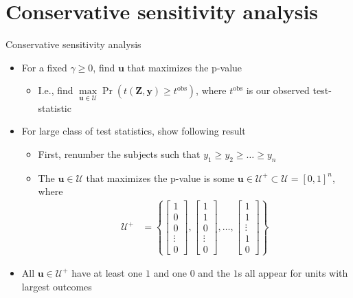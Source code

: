 \documentclass[table, xcolor={dvipsnames}, 9pt]{beamer}
\theoremstyle{newstyle}
\begin{document}
\section{Conservative sensitivity analysis}
\begin{frame}{Conservative sensitivity analysis}
\vfill
\begin{itemize} \vfill
\item For a fixed $\gamma \geq 0$, find $\mathbf{u}$ that maximizes the p-value  \vfill
\begin{itemize} \vfill
\item \pause I.e., find $\max \limits_{\mathbf{u} \in \mathcal{U}} \Pr\left(t\left(\mathbf{Z}, \mathbf{y}\right) \geq t^{\text{obs}} \right)$, where $t^{\text{obs}}$ is our observed test-statistic \vfill
\end{itemize}	\vfill
\item \pause For large class of test statistics, \citet{rosenbaumkrieger1990} show following result \vfill
\begin{itemize} \vfill
\item First, renumber the subjects such that $y_1 \geq y_2 \geq \ldots \geq y_n$ \pause \vfill
\item The $\mathbf{u} \in \mathcal{U}$ that maximizes the p-value is some $\mathbf{u} \in \mathcal{U}^+ \subset \mathcal{U} = \left[0, 1\right]^n$, where \pause \vfill
\begin{align*}
\mathcal{U}^+ & = \left\{
\begin{bmatrix} 1 \\ 0 \\ 0 \\ \vdots \\ 0 \end{bmatrix},
\begin{bmatrix} 1 \\ 1 \\ 0 \\ \vdots \\ 0 \end{bmatrix},
\ldots , 
\begin{bmatrix} 1 \\ 1 \\ \vdots \\ 1 \\ 0 \end{bmatrix}
\right\}
\end{align*} \vfill
\end{itemize} \vfill
\item \pause All $\mathbf{u} \in \mathcal{U}^+$ have at least one $1$ and one $0$ and the $1$s all appear for units with largest outcomes \vfill
\end{itemize} \vfill
\end{frame}
\end{document}
